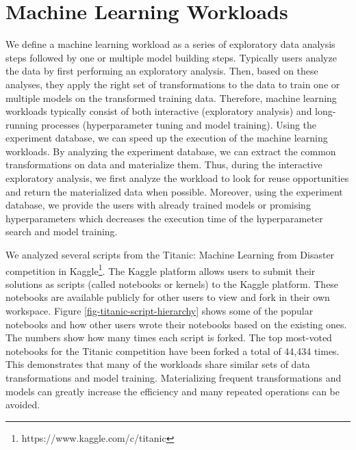 \section{Machine Learning Workloads} \label{sec-ml-workloads}
We define a machine learning workload as a series of exploratory data analysis steps followed by one or multiple model building steps.
Typically users analyze the data by first performing an exploratory analysis.
Then, based on these analyses, they apply the right set of transformations to the data to train one or multiple models on the transformed training data.
Therefore, machine learning workloads typically consist of both interactive (exploratory analysis) and long-running processes (hyperparameter tuning and model training).
Using the experiment database, we can speed up the execution of the machine learning workloads.
By analyzing the experiment database, we can extract the common transformations on data and materialize them.
Thus, during the interactive exploratory analysis, we first analyze the workload to look for reuse opportunities and return the materialized data when possible.
Moreover, using the experiment database, we provide the users with already trained models or promising hyperparameters which decreases the execution time of the hyperparameter search and model training.

We analyzed several scripts from the Titanic: Machine Learning from Disaster competition in Kaggle\footnote{https://www.kaggle.com/c/titanic}.
The Kaggle platform allows users to submit their solutions as scripts (called notebooks or kernels) to the Kaggle platform.
These notebooks are available publicly for other users to view and fork in their own workspace.
Figure \ref{fig-titanic-script-hierarchy} shows some of the popular notebooks and how other users wrote their notebooks based on the existing ones.
The numbers show how many times each script is forked.
The top most-voted notebooks for the Titanic competition have been forked a total of 44,434 times.
This demonstrates that many of the workloads share similar sets of data transformations and model training.
Materializing frequent transformations and models can greatly increase the efficiency and many repeated operations can be avoided.

